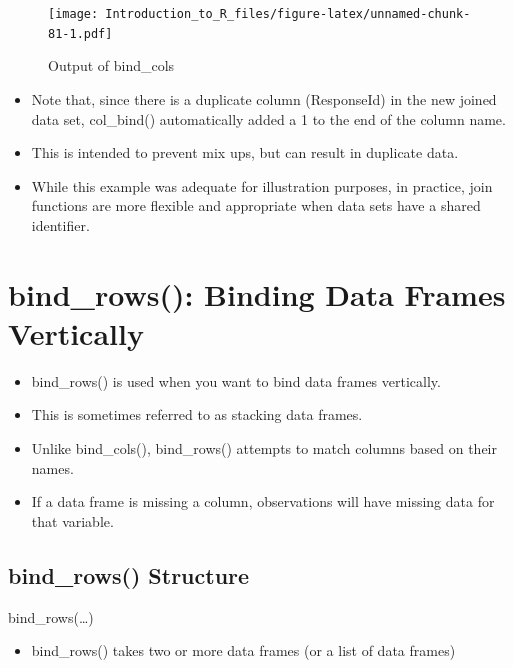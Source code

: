 \documentclass[]{book}
\providecommand{\tightlist}{%
  \setlength{\itemsep}{0pt}\setlength{\parskip}{0pt}}
\theoremstyle{definition}
\theoremstyle{definition}
\theoremstyle{definition}
\theoremstyle{remark}
\begin{document}
\begin{figure}
\centering
\texttt{[image: Introduction\_to\_R\_files/figure-latex/unnamed-chunk-81-1.pdf]}
\caption{\label{fig:unnamed-chunk-81}Output of bind\_cols}
\end{figure}

\begin{itemize}
\tightlist
\item
  Note that, since there is a duplicate column (ResponseId) in the new joined data set, col\_bind() automatically added a 1 to the end of the column name.
\item
  This is intended to prevent mix ups, but can result in duplicate data.
\item
  While this example was adequate for illustration purposes, in practice, join functions are more flexible and appropriate when data sets have a shared identifier.
\end{itemize}

\hypertarget{bind_rows-binding-data-frames-vertically}{%
\section{bind\_rows(): Binding Data Frames Vertically}\label{bind_rows-binding-data-frames-vertically}}

\begin{itemize}
\tightlist
\item
  bind\_rows() is used when you want to bind data frames vertically.
\item
  This is sometimes referred to as stacking data frames.
\item
  Unlike bind\_cols(), bind\_rows() attempts to match columns based on their names.
\item
  If a data frame is missing a column, observations will have missing data for that variable.
\end{itemize}

\hypertarget{bind_rows-structure}{%
\subsection{bind\_rows() Structure}\label{bind_rows-structure}}

bind\_rows(\ldots{})

\begin{itemize}
\tightlist
\item
  bind\_rows() takes two or more data frames (or a list of data frames)
\end{itemize}
\end{document}
